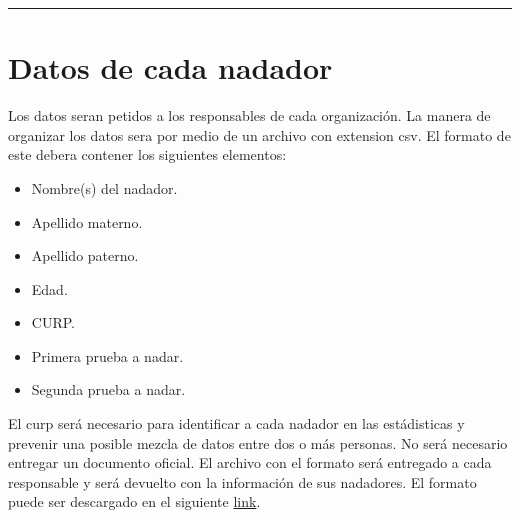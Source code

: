 \hrule
\section{Datos de cada nadador}
Los datos seran petidos a los responsables de cada organización. La manera de organizar los datos sera por medio de un archivo con extension csv. El formato de este debera contener los siguientes elementos:
\begin{itemize}
    \item Nombre(s) del nadador.
    \item Apellido materno.
    \item Apellido paterno.
    \item Edad.
    \item CURP.
    \item Primera prueba a nadar.
    \item Segunda prueba a nadar.
\end{itemize}
El curp será necesario para identificar a cada nadador en las estádisticas y prevenir una posible mezcla de datos entre dos o más personas. No será necesario entregar un documento oficial. El archivo con el formato será entregado a cada responsable y será devuelto con la información de sus nadadores. El formato puede ser descargado en el siguiente \href{https://downgit.github.io/#/home?url=https://github.com/giovannilopez9808/Competencia_2021/blob/main/Formats/data.csv}{link}.

